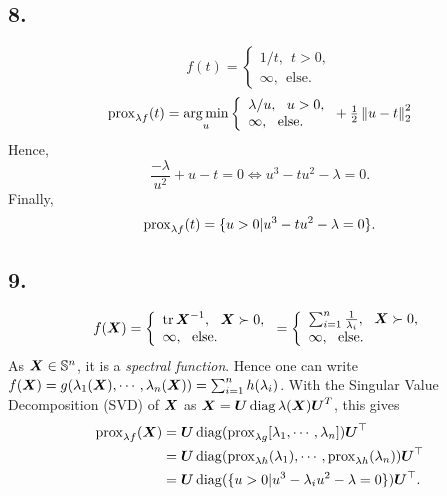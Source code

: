 \subsection{8.}
%
\begin{equation*}
    f(t) = \left\{
        \begin{array}{ll}
          1/t,~~t>0, \\
            \infty,~~ \text{else}.
        \end{array}
      \right.
\end{equation*}
%
\begin{equation*}
    \operatorname{prox}_{\lambda f}(t) = \operatorname*{arg\,min}_u \left\{
        \begin{array}{ll}
            \lambda/{ u},~~u>0, \\
            \infty,~~ \text{else}.
        \end{array}
    \right. + {\textstyle\frac{1}{2}} \left\lVert u-t\right\rVert_{2}^2 
\end{equation*}
%
Hence,
%
\begin{equation*}
    \frac{-\lambda}{u^2} + u - t = 0 \Leftrightarrow 
    u^3 - tu^2-\lambda=0.
\end{equation*}
%
Finally,
%
\begin{equation}
    \operatorname{prox}_{\lambda f}(t) = \{ u>0 | u^3 
    - tu^2-\lambda=0  \}.
\end{equation}
%
\subsection{9.}
%
\begin{equation*}
    f(\boldsymbol X) = \left\{
        \begin{array}{ll}
          \operatorname{tr} \boldsymbol X^{-1},~~\boldsymbol X \succ 0, \\
            \infty,~~ \text{else}.
        \end{array}
    \right.
    = \left\{
        \begin{array}{ll}
        \sum_{i=1}^n {\textstyle\frac{1}{\lambda_i}},~~\boldsymbol X \succ 0, \\
            \infty,~~ \text{else}.
        \end{array}
    \right. 
\end{equation*}
%
As $\boldsymbol X \in \mathbb S^n$, it is a \emph{spectral function}.
Hence one can write $f(\boldsymbol X) = g(\lambda_1(\boldsymbol X), \cdots,
\lambda_n(\boldsymbol X)) = \sum_{i=1}^n h(\lambda_i)$. 
%
With the Singular Value Decomposition (SVD) of $\boldsymbol X$ as 
$\boldsymbol X = \boldsymbol U \operatorname{diag}{\lambda (\boldsymbol X)} \boldsymbol U^T$, this gives
%
\begin{align*}
\begin{split}
    \operatorname{prox}_{\lambda f} (\boldsymbol X) &= \boldsymbol U \operatorname{diag}(\operatorname{prox}_{\lambda g} 
    [\lambda_1,\cdots, \lambda_n]) \boldsymbol U^\top \\
    &= \boldsymbol U \operatorname{diag}(\operatorname{prox}_{\lambda h} (\lambda_1), \cdots,
    \operatorname{prox}_{\lambda h} (\lambda_n)) \boldsymbol U^\top \\
    &= \boldsymbol U \operatorname{diag}(\{ u>0| u^3-\lambda_i u^2-\lambda=0 \})
    \boldsymbol U^\top.
\end{split}
\end{align*}
%
